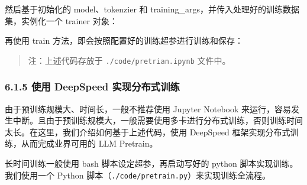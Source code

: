 \documentclass[12pt,a4paper]{book}
\begin{document}
然后基于初始化的 model、tokenzier 和
training\_args，并传入处理好的训练数据集，实例化一个 trainer 对象：

\begin{Shaded}
\begin{Highlighting}[]
 

\OperatorTok{=}
\OperatorTok{=}
\OperatorTok{=}
\OperatorTok{=}
\OperatorTok{=} \NormalTok{,}
\OperatorTok{=}
\OperatorTok{=}
\NormalTok{)}
\end{Highlighting}
\end{Shaded}

再使用 train 方法，即会按照配置好的训练超参进行训练和保存：

\begin{Shaded}
\begin{Highlighting}[]
\end{Highlighting}
\end{Shaded}

\begin{quote}
注：上述代码存放于 \texttt{./code/pretrian.ipynb} 文件中。
\end{quote}

\subsubsection{6.1.5 使用 DeepSpeed
实现分布式训练}\label{ux4f7fux7528-deepspeed-ux5b9eux73b0ux5206ux5e03ux5f0fux8badux7ec3}

由于预训练规模大、时间长，一般不推荐使用 Jupyter Notebook
来运行，容易发生中断。且由于预训练规模大，一般需要使用多卡进行分布式训练，否则训练时间太长。在这里，我们介绍如何基于上述代码，使用
DeepSpeed 框架实现分布式训练，从而完成业界可用的 LLM Pretrain。

长时间训练一般使用 bash 脚本设定超参，再启动写好的 python
脚本实现训练。我们使用一个 Python
脚本（\texttt{./code/pretrain.py}）来实现训练全流程。
\end{document}
